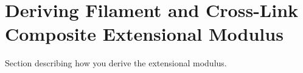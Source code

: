 \documentclass[pre,preprint]{revtex4-1}
\begin{document}
\section{Deriving Filament and Cross-Link Composite Extensional Modulus}
\label{app:compos}
Section describing how you derive the extensional modulus.

\end{document}
